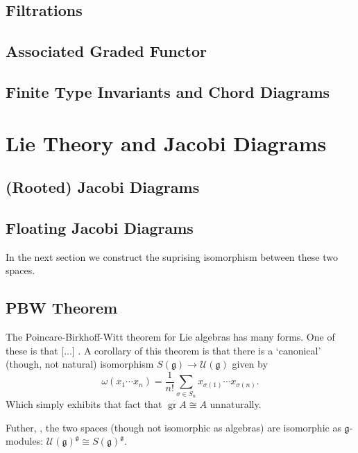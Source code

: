 \documentclass[12pt]{report}
\theoremstyle{regular}
\newcommand{\scaffold}[1]{
\begin{mdframed}[style=scaffold]
        {\color{teal}#1}
\end{mdframed}
}
\begin{document}
        \section{Filtrations}
        \section{Associated Graded Functor}

        \section{Finite Type Invariants and Chord Diagrams}

        \chapter{Lie Theory and Jacobi Diagrams}

        \section{(Rooted) Jacobi Diagrams}

        \section{Floating Jacobi Diagrams}

        \scaffold{In the next section we construct the suprising isomorphism between these two spaces.}

        \section{PBW Theorem}

        \scaffold{The Poincare-Birkhoff-Witt theorem for Lie algebras has many forms. One of these is that [...] . A corollary of this theorem \cite{enveloping-algebras} is that there is a `canonical' (though, not natural) isomorphism \(S(\mathfrak{g}) \to \mathcal{U}(\mathfrak{g})\) given by \[\omega(x_{1} \cdots x_{n}) = \frac{1}{n!} \sum_{\sigma \in S_{n}} x_{\sigma(1)} \cdots x_{\sigma(n)}.\] Which simply exhibits that fact that \(\operatorname{gr} A \cong A\) unnaturally.}

        \scaffold{Futher, \cite{enveloping-algebras}, the two spaces (though not isomorphic as algebras) are isomorphic as \(\mathfrak{g}\)-modules: \(\mathcal{U}(\mathfrak{g})^{\mathfrak{g}} \cong S(\mathfrak{g})^{\mathfrak{g}}\).}
\end{document}
